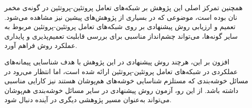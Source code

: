 همچنین تمرکز اصلی این پژوهش بر شبکه‌های تعامل پروتئین-پروتئین در گونه‌ی مخمر نان بوده است، موضوعی که در بسیاری از پژوهش‌های پیشین نیز مشاهده می‌شود. تعمیم و ارزیابی روش پیشنهادی بر روی شبکه‌های تعامل پروتئین-پروتئین مربوط به سایر گونه‌ها، می‌تواند چشم‌انداز مناسبی برای بررسی قابلیت تعمیم‌پذیری و پایداری عملکرد روش فراهم آورد.

افزون بر این، هرچند روش پیشنهادی در این پژوهش با هدف شناسایی پیمانه‌های عملکردی در شبکه‌های تعامل پروتئین-پروتئین ارائه شده است، اما انتظار می‌رود در مسائل خوشه‌بندی که مستلزم شناسایی خوشه‌های هم‌پوشان هستند نیز کارایی مناسبی داشته باشد. از این رو، آزمون روش پیشنهادی در سایر مسائل خوشه‌بندی هم‌پوشان می‌تواند به‌عنوان مسیر پژوهشی دیگری در آینده دنبال شود.